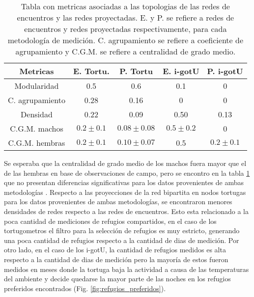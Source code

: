 \begin{table}[ht]
    \centering
    \begin{tabular}{|c|c|c|c|c|}
    \hline
    Metricas          & E. Tortu.   & P. Tortu      & E. i-gotU   & P. i-gotU    \\ \hline
    Modularidad       & 0.5         & 0.6           & 0.1        & 0            \\ \hline
    C. agrupamiento & 0.28        & 0.16          & 0           & 0            \\ \hline
    Densidad          & 0.22        & 0.09          & 0.50         & 0.13          \\ \hline
    C.G.M. machos     & $0.2\pm0.1$ & $0.08\pm0.08$ & $0.5\pm0.2$ & 0            \\ \hline
    C.G.M. hembras    & $0.2\pm0.1$ & $0.10\pm0.07$ & 0.5         & $0.2\pm0.1 $ \\ \hline
    \end{tabular}
    \caption[Tabla con metricas asociadas a las topologias de las redes de encuentros y las redes proyectadas.]{Tabla con metricas asociadas a las topologias de las redes de encuentros y las redes proyectadas. E. y P. se refiere a redes de encuentros y redes proyectadas respectivamente, para cada metodología de medición. C. agrupamiento se refiere a coeficiente de agrupamiento y C.G.M. se refiere a centralidad de grado medio.}
    \label{tab:metricas_topologia_redes}
\end{table}
Se esperaba que la centralidad de grado medio de los machos fuera mayor que el de las hembras en base de observaciones de campo, pero se encontro en la tabla \ref{tab:metricas_topologia_redes} que no presentan diferencias significativas para los datos provenientes de ambas metodologías \cite{Erika}. Respecto a las proyecciones de la red bipartita en nodos tortugas para los datos provenientes de ambas metodologías, se encontraron menores densidades de redes respecto a las redes de encuentros. Esto esta relacionado a la poca cantidad de mediciones de refugios compartidos, en el caso de los tortugometros el filtro para la selección de refugios es muy estricto, generando una poca cantidad de refugios respecto a la cantidad de dias de medición. Por otro lado, en el caso de los i-gotU, la cantidad de refugios medidos es alta respecto a la cantidad de dias de medición pero la mayoría de estos fueron medidos en meses donde la tortuga baja la actividad a causa de las temperaturas del ambiente y decide quedarse la mayor parte de las noches en los refugios preferidos encontrados (Fig. \ref{fig:refugios_preferidos}). 
